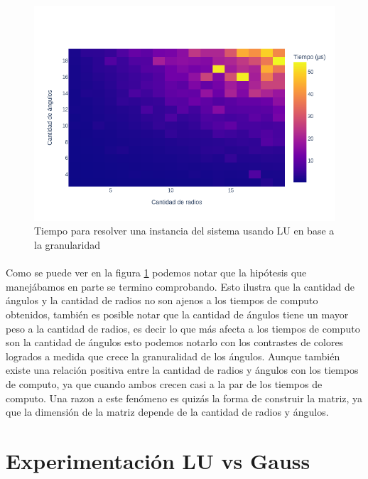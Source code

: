 \documentclass[12pt]{article}
\begin{document}
\begin{figure}[H]
	\centering
	\includegraphics[scale=0.5]{simple.1.granularity.heatmap}
	\caption{Tiempo para resolver una instancia del sistema usando LU en base a la granularidad}
	\label{fig:granularity.heatmap}
\end{figure}

\paragraph{} Como se puede ver en la figura \ref{fig:granularity.heatmap} podemos notar que la hipótesis que manejábamos en parte se termino comprobando. Esto ilustra que la cantidad de ángulos y la cantidad de radios no son ajenos a los tiempos de computo obtenidos, también es posible notar que la cantidad de ángulos tiene un mayor peso a la cantidad de radios, es  decir lo que más afecta a los tiempos de computo son la cantidad de ángulos esto podemos notarlo con los contrastes de colores logrados a medida que crece la granuralidad de los ángulos. Aunque también existe una relación positiva entre la cantidad de radios y ángulos con los tiempos de computo, ya que cuando ambos crecen casi a la par de los tiempos de computo. Una razon a este fenómeno es quizás la forma de construir la matriz, ya que la dimensión de la matriz depende de la cantidad de radios y ángulos.




\section{Experimentación LU vs Gauss}
\end{document}
